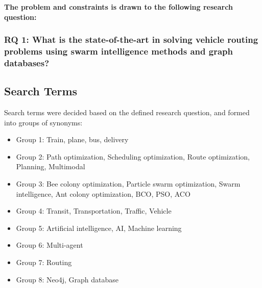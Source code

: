 \textbf{The problem and constraints is drawn to the following research question:}


\subsubsection*{RQ 1: What is the state-of-the-art in solving vehicle routing problems using swarm intelligence methods and graph databases?}


\subsection{Search Terms}
\label{sec:searchTerms}
Search terms were decided based on the defined research question, and formed into groups of synonyms:
\begin{itemize}
\item Group 1: Train, plane, bus, delivery
\item Group 2: Path optimization, Scheduling optimization, Route optimization, Planning, Multimodal
\item Group 3: Bee colony optimization, Particle swarm optimization, Swarm intelligence, Ant colony optimization, BCO, PSO, ACO
\item Group 4: Transit, Transportation, Traffic, Vehicle
\item Group 5: Artificial intelligence, AI, Machine learning
\item Group 6: Multi-agent
\item Group 7: Routing
\item Group 8: Neo4j, Graph database
\end{itemize}


